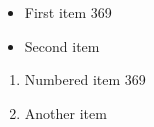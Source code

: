 \documentclass{article}
\begin{document}
\begin{itemize}
\item First item 369
\item Second item
\end{itemize}
\begin{enumerate}
\item Numbered item 369
\item Another item
\end{enumerate}
\end{document}
